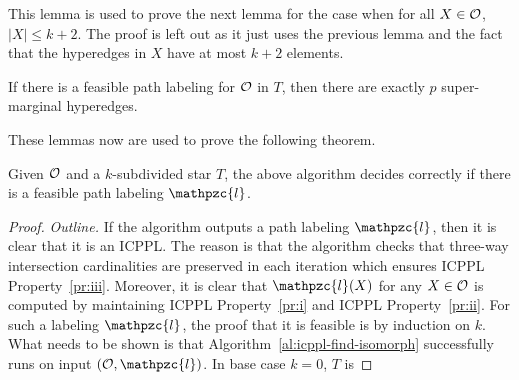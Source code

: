 \documentclass[11pt,
               envcountsect,
               envcountsame]
               {../lib/llncs2e/llncs}
\def\cO{{\cal O}}
\def\cl{\mathpzc{l}}
\def\icpplpr{Property}
\begin{document}
This lemma is used to prove the next lemma for the case when for all
$X \in \cO$, $|X| \leq k+2$.  The proof is left out as it just uses
the previous lemma and the fact that the hyperedges in $X$ have at
most $k+2$ elements.
\begin{lemma}
  If there is a feasible path labeling for $\cO$ in $T$, then there
  are exactly $p$ super-marginal hyperedges.
\end{lemma}
These lemmas now are used to prove the following theorem.
\begin{theorem}
  Given $\cO$ and a $k$-subdivided star $T$, the above algorithm
  decides correctly if there is a feasible path labeling $\cl$.
\end{theorem}
\begin{proof} {\em Outline.}
  If the algorithm outputs a path labeling $\cl$, then it is clear
  that it is an ICPPL. The reason is that the algorithm checks that
  three-way intersection cardinalities are preserved in each iteration
  which ensures ICPPL \icpplpr~\ref{pr:iii}. Moreover, it is clear that
  $\cl(X)$ for any $X \in \cO$ is computed by maintaining
  ICPPL \icpplpr~\ref{pr:i} and ICPPL \icpplpr~\ref{pr:ii}. For such a labeling
  $\cl$, the proof that it is feasible is by induction on $k$. What
  needs to be shown is that Algorithm~\ref{al:icppl-find-isomorph}
  successfully runs on input $(\cO, \cl)$. In base case $k=0$, $T$ is

\end{proof}
\end{document}
